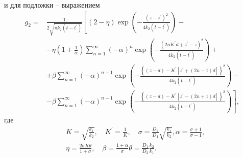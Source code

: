 и для подложки -- выражением
\begin{equation}
	\begin{aligned}
		g_2=& \frac{1}{2 \sqrt{\pi k_2\left(t-t^{\prime}\right)}}\left[(2-\eta) \exp \left(-\frac{\left(z-z^{\prime}\right)^2}{4 k_2\left(t-t^{\prime}\right)}\right)\right.-\\
		&-\eta\left(1+\frac{1}{\alpha}\right) \sum_{n=1}^{\infty}(-\alpha)^n \exp \left(-\frac{\left(2 n K^{\prime} d+z^{\prime}-z\right)^2}{4 k_2\left(t-t^{\prime}\right)}\right)+\\
		&+\beta \sum_{n=1}^{\infty}(-\alpha)^{n-1} \exp \left(-\frac{\left\{(z-d)-K^{\prime}\left[z^{\prime}+(2 n-1) d\right]\right\}^2}{4 k_2\left(t-t^{\prime}\right)}\right)-\\
		&-\beta \sum_{n=1}^{\infty}(-\alpha)^{n-1}\left.\exp \left(-\frac{\left\{(z-d)-K^{\prime}\left[z^{\prime}-(2 n+1) d\right]\right\}^2}{4 k_2\left(t-t^{\prime}\right)}\right)\right],
	\end{aligned}
\end{equation}
где
\begin{equation}
	\begin{aligned}
		&K=\sqrt{\frac{k_1}{k_2}}, \quad K^{\prime}=\frac{1}{K}, \quad \sigma=\frac{D_2}{D_1} \sqrt{\frac{k_1}{k_2}}, \alpha=\frac{\sigma+1}{\sigma-1},\\
		&\eta=\frac{2 \sigma K \theta}{1+\sigma}, \quad \beta=\frac{1+\alpha}{\sigma} \theta=\frac{D_1}{D_2} \frac{k_2}{k_1}.
	\end{aligned}
\end{equation}








